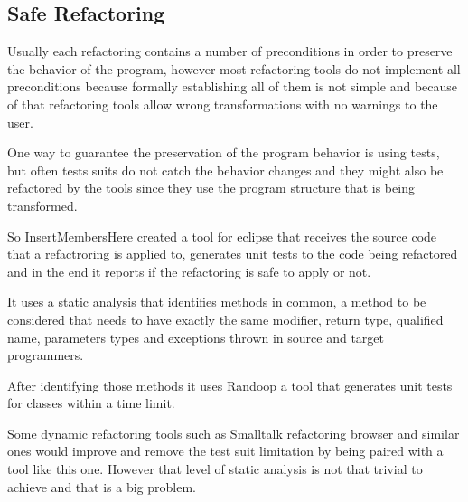 \subsection{Safe Refactoring}
\cite{soares2010making} Usually each refactoring contains a number of preconditions in order to preserve the behavior of the program, however most refactoring tools do not implement all preconditions because formally establishing all of them is not simple and because of that refactoring tools allow wrong transformations with no warnings to the user.

One way to guarantee the preservation of the program behavior is using tests, but often tests suits do not catch the behavior changes and they might also be refactored by the tools since they use the program structure that is being transformed.

So InsertMembersHere created a tool for eclipse that receives the source code that a refactroring is applied to, generates unit tests to the code being refactored and in the end it reports if the refactoring is safe to apply or not.

It uses a static analysis that identifies methods in common, a method to be considered that needs to have exactly the same modifier, return type, qualified name, parameters types and exceptions thrown in source and target programmers.

After identifying those methods it uses Randoop \cite{pacheco2007feedback}%
 a tool that generates unit tests for classes within a time limit.

Some dynamic refactoring tools such as Smalltalk refactoring browser and similar ones would improve and remove the test suit limitation by being paired with a tool like this one. However that level of static analysis is not that trivial to achieve and that is a big problem. %